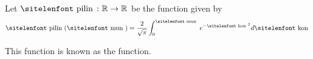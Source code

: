 \documentclass{article}
\begin{document}
	Let $\tokipilin \colon \mathbb R \to \mathbb R$ be the function given by
	\[ \tokipilin(\tokimun) = \frac{2}{\sqrt \pi} \int_0^{\tokimun} e^{-\tokikon^2} d \tokikon \]

	This function is known as the  function.	
\end{document}
